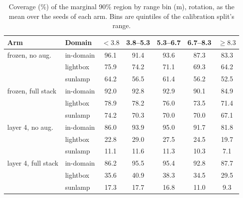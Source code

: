 \begin{table}[ht]
  \caption{Coverage (\%) of the marginal 90\% region by range bin (m), rotation, as the mean over the seeds of each arm. Bins are quintiles of the calibration split's range.}
  \label{tab:rangebins-rotation}
  \centering
  \scriptsize
  \setlength{\tabcolsep}{4pt}
  \begin{tabular}{l l ccccc}
    \toprule
    Arm & Domain & $<3.8$ & 3.8--5.3 & 5.3--6.7 & 6.7--8.3 & $\geq8.3$ \\
    \midrule
    frozen, no aug. & in-domain & 96.1 & 91.4 & 93.6 & 87.3 & 83.3 \\
     & lightbox & 75.9 & 74.2 & 71.1 & 69.3 & 64.2 \\
     & sunlamp & 64.2 & 56.5 & 61.4 & 56.2 & 52.5 \\
    \midrule
    frozen, full stack & in-domain & 92.0 & 92.8 & 92.9 & 90.1 & 84.9 \\
     & lightbox & 78.9 & 78.2 & 76.0 & 73.5 & 71.4 \\
     & sunlamp & 74.2 & 70.3 & 70.0 & 70.0 & 67.1 \\
    \midrule
    layer 4, no aug. & in-domain & 86.0 & 93.9 & 95.0 & 91.7 & 81.8 \\
     & lightbox & 22.8 & 29.0 & 27.5 & 24.5 & 19.7 \\
     & sunlamp & 11.1 & 11.6 & 11.3 & 10.3 & 7.1 \\
    \midrule
    layer 4, full stack & in-domain & 86.2 & 95.5 & 95.4 & 92.8 & 87.7 \\
     & lightbox & 35.6 & 40.9 & 38.3 & 34.5 & 29.5 \\
     & sunlamp & 17.3 & 17.7 & 16.8 & 11.0 & 9.3 \\
    \bottomrule
  \end{tabular}
\end{table}
